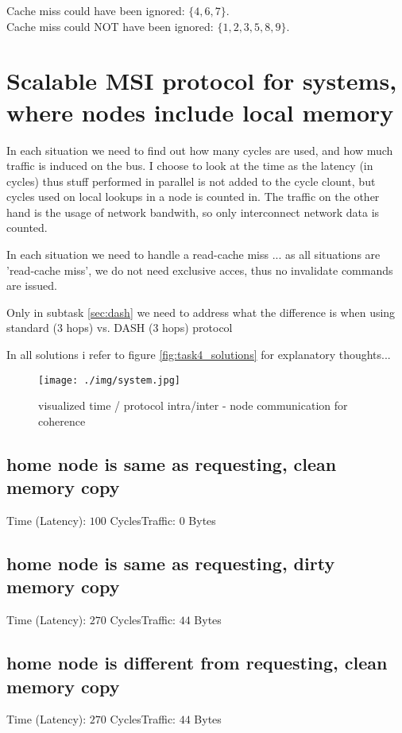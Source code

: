 \documentclass[a4paper,10pt]{article}
\begin{document}
Cache miss could have been ignored: $\lbrace 4,6,7 \rbrace$. \\
Cache miss could NOT have been ignored: $\lbrace 1,2,3,5,8,9 \rbrace$. \\

\newpage

\section{Scalable MSI protocol for systems, where nodes include local memory}
In each situation we need to find out how many cycles are used, and how much traffic is induced on the bus.
I choose to look at the time as the latency (in cycles) thus stuff performed in parallel is not added to the cycle clount, but cycles used on local lookups in a node is counted in. 
The traffic on the other hand is the usage of network bandwith, so only interconnect network data is counted.

In each situation we need to handle a read-cache miss ...
as all situations are 'read-cache miss', we do not need exclusive acces, thus no invalidate commands are issued.

Only in subtask \ref{sec:dash} we need to address what the difference is when using standard (3 hops) vs. DASH (3 hops) protocol

In all solutions i refer to figure \ref{fig:task4_solutions} for explanatory thoughts...

\begin{figure}[h!]
 \centering
 \texttt{[image: ./img/system.jpg]}
 \label{fig:4_system}
 \caption{visualized time / protocol intra/inter - node communication for coherence}
\end{figure}


\subsection{home node is same as requesting, clean memory copy}
Time (Latency): $100$ Cycles\qquad Traffic: $0$ Bytes


\subsection{home node is same as requesting, dirty memory copy}
Time (Latency): $270$ Cycles\qquad Traffic: $44$ Bytes

\subsection{home node is different from requesting, clean memory copy}
Time (Latency): $270$ Cycles\qquad Traffic: $44$ Bytes
\end{document}
